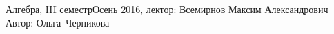 


\BigHeader
	{Алгебра, III семестр}{Осень 2016, лектор: Всемирнов Максим Александрович}
	{Автор: Ольга~Черникова}


